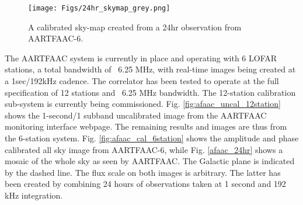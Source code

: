 \documentclass{ws-jai}
\begin{document}
\begin{figure}
  \texttt{[image: Figs/24hr\_skymap\_grey.png]}
  \caption{A calibrated sky-map created from a 24hr observation from AARTFAAC-6.}
  \label{fig:afaac_24hr}
  
\end{figure}
The AARTFAAC system is currently in place and operating with 6 LOFAR stations, a
total  bandwidth  of  ~6.25  MHz,  with real-time  images  being  created  at  a
1sec/192kHz  cadence. The  correlator has  been tested  to operate  at the  full
specification of 12 stations and ~6.25 MHz bandwidth. The 12-station calibration
sub-system is currently being commissioned. Fig. \ref{fig:afaac_uncal_12station}
shows the  1-second/1 subband  uncalibrated image  from the  AARTFAAC monitoring
interface webpage. The remaining results and  images are thus from the 6-station
system.   Fig.   \ref{fig:afaac_cal_6station}  shows  the  amplitude  and  phase
calibrated all  sky image from  AARTFAAC-6, while Fig. \ref{afaac_24hr}  shows a
mosaic of the whole sky as seen  by AARTFAAC. The Galactic plane is indicated by
the dashed line. The flux scale on both images is arbitrary. The latter has been
created by  combining 24  hours of observations  taken at 1  second and  192 kHz
integration.\\
\end{document}
